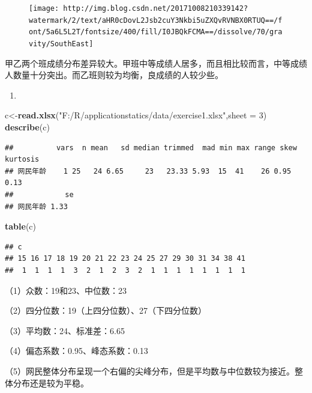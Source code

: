 \documentclass[]{article}
\newenvironment{Shaded}{\begin{snugshade}}{\end{snugshade}}
\newcommand{\KeywordTok}[1]{\textcolor[rgb]{0.13,0.29,0.53}{\textbf{#1}}}
\newcommand{\DataTypeTok}[1]{\textcolor[rgb]{0.13,0.29,0.53}{#1}}
\newcommand{\DecValTok}[1]{\textcolor[rgb]{0.00,0.00,0.81}{#1}}
\newcommand{\StringTok}[1]{\textcolor[rgb]{0.31,0.60,0.02}{#1}}
\newcommand{\NormalTok}[1]{#1}
\begin{document}
\begin{figure}
\centering
\texttt{[image: http://img.blog.csdn.net/20171008210339142?watermark/2/text/aHR0cDovL2Jsb2cuY3Nkbi5uZXQvRVNBX0RTUQ==/font/5a6L5L2T/fontsize/400/fill/I0JBQkFCMA==/dissolve/70/gravity/SouthEast]}
\caption{}
\end{figure}

甲乙两个班成绩分布差异较大。甲班中等成绩人居多，而且相比较而言，中等成绩人数量十分突出。而乙班则较为均衡，良成绩的人较少些。

\begin{enumerate}
\def\labelenumi{\arabic{enumi}.}
\setcounter{enumi}{2}
\item
\end{enumerate}

\begin{Shaded}
\begin{Highlighting}[]
\NormalTok{c<-}\KeywordTok{read.xlsx}\NormalTok{(}\StringTok{"F:/R/applicationstatics/data/exercise1.xlsx"}\NormalTok{,}\DataTypeTok{sheet =} \DecValTok{3}\NormalTok{)}
\KeywordTok{describe}\NormalTok{(c)}
\end{Highlighting}
\end{Shaded}

\begin{verbatim}
##          vars  n mean   sd median trimmed  mad min max range skew kurtosis
## 网民年龄    1 25   24 6.65     23   23.33 5.93  15  41    26 0.95     0.13
##            se
## 网民年龄 1.33
\end{verbatim}

\begin{Shaded}
\begin{Highlighting}[]
\KeywordTok{table}\NormalTok{(c)}
\end{Highlighting}
\end{Shaded}

\begin{verbatim}
## c
## 15 16 17 18 19 20 21 22 23 24 25 27 29 30 31 34 38 41 
##  1  1  1  1  3  2  1  2  3  2  1  1  1  1  1  1  1  1
\end{verbatim}

（1）众数：19和23、中位数：23

（2）四分位数：19（上四分位数）、27（下四分位数）

（3）平均数：24、标准差：6.65

（4）偏态系数：0.95、峰态系数：0.13

（5）网民整体分布呈现一个右偏的尖峰分布，但是平均数与中位数较为接近。整体分布还是较为平稳。
\end{document}
